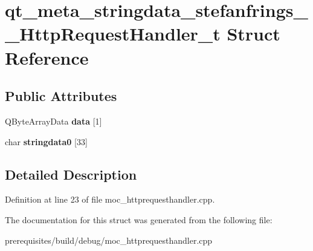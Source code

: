 \hypertarget{structqt__meta__stringdata__stefanfrings_____http_request_handler__t}{}\section{qt\+\_\+meta\+\_\+stringdata\+\_\+stefanfrings\+\_\+\+\_\+\+Http\+Request\+Handler\+\_\+t Struct Reference}
\label{structqt__meta__stringdata__stefanfrings_____http_request_handler__t}
\subsection*{Public Attributes}
\begin{DoxyCompactItemize}
\item 
\mbox{\label{structqt__meta__stringdata__stefanfrings_____http_request_handler__t_a107c0fa2104631f0a2bff5283028220b}} 
Q\+Byte\+Array\+Data {\bfseries data} \mbox{[}1\mbox{]}
\item 
\mbox{\label{structqt__meta__stringdata__stefanfrings_____http_request_handler__t_a926b0a34684b27d2be51b270f8980933}} 
char {\bfseries stringdata0} \mbox{[}33\mbox{]}
\end{DoxyCompactItemize}


\subsection{Detailed Description}


Definition at line 23 of file moc\+\_\+httprequesthandler.\+cpp.



The documentation for this struct was generated from the following file\+:\begin{DoxyCompactItemize}
\item 
prerequisites/build/debug/moc\+\_\+httprequesthandler.\+cpp\end{DoxyCompactItemize}
